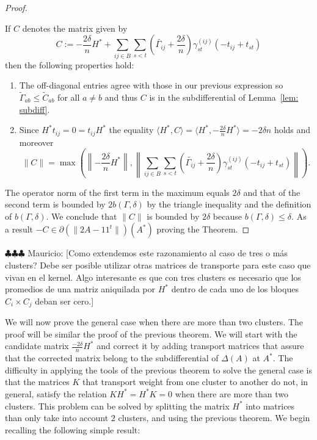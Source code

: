 \documentclass[12pt]{amsart}
\theoremstyle{remark}
\newcommand{\mv}[1]{{\color{red} \sf $\clubsuit\clubsuit\clubsuit$ Mauricio: [#1]}}
\begin{document}
\begin{proof}
\begin{enumerate}
\end{enumerate}
If $C$ denotes the matrix given by
\[C:= -\frac{2\delta}{n}H^* + \sum_{ij\in B} \sum_{s<t} \left(\widetilde{\Gamma_{ij}}+\frac{2\delta}{n}\right)\gamma_{st}^{(ij)} (-t_{ij}+t_{st})\]
then the following properties hold:
\begin{enumerate}
\item The off-diagonal entries agree with those in our previous expression so $\widetilde{\Gamma}_{ab}\leq \widetilde{C}_{ab}$ for all $a\neq b$ and thus $C$ is in the subdifferential of Lemma~\ref{lem: subdiff}.
\item Since $H^*t_{ij}=0=t_{ij}H^*$ the equality $\langle H^*, C\rangle =\langle H^*,-\frac{2\delta}{n}H^*\rangle = -2\delta n$ holds and moreover
\[ \| C\|=\max\left(\left\|-\frac{2\delta}{n}H^*\right\|, \left\|\sum_{ij\in B} \sum_{s<t} \left(\widetilde{\Gamma_{ij}}+\frac{2\delta}{n}\right)\gamma_{st}^{(ij)} (-t_{ij}+t_{st})\right\|\right).\] 
\end{enumerate}
The operator norm of the first term in the maximum equals $2\delta$ and that of the second term is bounded by $2b(\Gamma,\delta)$ by the triangle inequality and the definition of $b(\Gamma,\delta)$. We conclude that $\|C\|$ is bounded by $2\delta$ because $b(\Gamma,\delta)\leq \delta$. As a result $-C\in \partial\left(\|2A-11^t\|\right)(A^*)$ proving the Theorem.
\end{proof}

\mv{Como extendemos este razonamiento al caso de tres o m\'as clusters? Debe ser posible utilizar otras matrices de transporte para este caso que vivan en el kernel. Algo interesante es que con tres clusters es necesario que los promedios de una matriz aniquilada por $H^*$ dentro de cada uno de los bloques $C_i\times C_j$ deban ser cero.} 

We will now prove the general case when there are more than two clusters. The proof will be similar the proof of the previous theorem. We will start with the candidate matrix $\frac{-2\delta}{n}H^*$ and correct it by adding transport matrices that assure that the corrected matrix belong to the subdifferential of $\Delta(A)$ at $A^*$.
The difficulty in applying the tools of the previous theorem to solve the general case is that the matrices $K$ that transport weight from one cluster to another do not, in general, satisfy the relation $KH^* = H^*K = 0$ when there are more than two clusters. This problem can be solved by splitting the matrix $H^*$ into matrices than only take into account $2$ clusters, and using the previous theorem.
We begin recalling the following simple result:
\end{document}
